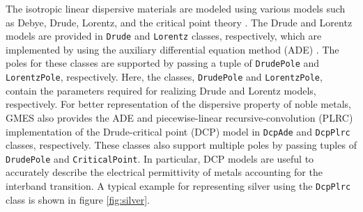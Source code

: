 The isotropic linear dispersive materials are modeled using various models such as Debye, Drude, Lorentz, and the critical point theory \cite{ashcroft_solid_1976, etchegoin_elasto-optical_1993}. The Drude and Lorentz models are provided in \texttt{Drude} and \texttt{Lorentz} classes, respectively, which are implemented by using the auxiliary differential equation method (ADE) \cite{okoniewski_drude_2006, okoniewski_simple_1997}. The poles for these classes are supported by passing a tuple of \texttt{DrudePole} and \texttt{LorentzPole}, respectively. Here, the classes, \texttt{DrudePole} and \texttt{LorentzPole}, contain the parameters required for realizing Drude and Lorentz models, respectively. For better representation of the dispersive property of noble metals, GMES also provides the ADE and piecewise-linear recursive-convolution (PLRC) implementation of the Drude-critical point (DCP) model \cite{prokopeva_optical_2011} in \texttt{DcpAde} and \texttt{DcpPlrc} classes, respectively. These classes also support multiple poles by passing tuples of \texttt{DrudePole} and \texttt{CriticalPoint}. In particular, DCP models are useful to accurately describe the electrical permittivity of metals accounting for the interband transition. A typical example for representing silver using the \texttt{DcpPlrc} class is shown in figure \ref{fig:silver}.

